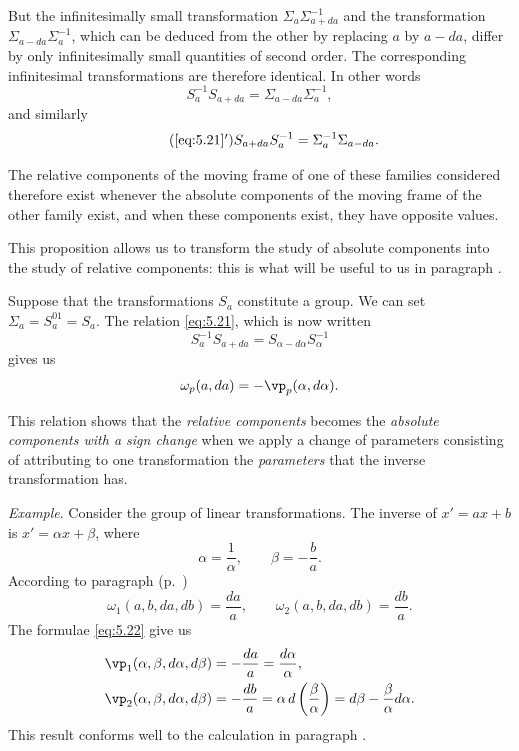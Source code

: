But the infinitesimally small transformation $\Sigma_{a}\Sigma_{a+da}^{-1}$ and the transformation $\Sigma_{a-da}\Sigma_{a}^{-1}$, which can be deduced from the other by replacing $a$ by $a-da$, differ by only infinitesimally small quantities of second order. The corresponding infinitesimal transformations are therefore identical. In other words
\begin{equation}
  \label{eq:5.21}
  S_{a}^{-1}S_{a+da}=\Sigma_{a-da}\Sigma_{a}^{-1},
\end{equation}
and similarly
\begin{equation}
  \label{eq:5.21'}\tag{\ref{eq:5.21}$'$}
  S_{a+da}S_{a}^{-1}=\Sigma^{-1}_{a}\Sigma_{a-da}.
\end{equation}

The relative components of the moving frame of one of these families considered therefore exist whenever the absolute components of the moving frame of the other family exist, and when these components exist, they have opposite values.

This proposition allows us to transform the study of absolute components into the study of relative components: this is what will be useful to us in paragraph .

Suppose that the transformations $S_{a}$ constitute a group. We can set $\Sigma_{a}=S_{a}^{01}=S_{a}$. The relation \eqref{eq:5.21}, which is now written
\[
S_{a}^{-1}S_{a+da}=S_{\alpha-d\alpha}S_{\alpha}^{-1}
\]
gives us
\begin{equation}
  \label{eq:5.22}
  \omega_{p}(a,da)=-\vp_{p}(\alpha,d\alpha).
\end{equation}

This relation shows that the \emph{relative components} becomes the \emph{absolute components with a sign change} when we apply a change of parameters consisting of attributing to one transformation the \emph{parameters} that the inverse transformation has.

\somespace

{\small
\emph{Example}. Consider the group of linear transformations. The inverse of $x'=ax+b$ is $x'=\alpha x+\beta$, where
\[
\alpha=\frac{1}{\alpha},\qquad \beta=-\frac{b}{a}.
\]
According to paragraph  (p.~\pageref{sec:71})
\[
\omega_{1}(a,b,da,db)=\frac{da}{a},\qquad \omega_{2}(a,b,da,db)=\frac{db}{a}.
\]
The formulae \eqref{eq:5.22} give us
\begin{align*}
  \vp_{1}(\alpha,\beta,d\alpha,d\beta)&=-\frac{da}{a}=\frac{d\alpha}{\alpha},\\
  \vp_{2}(\alpha,\beta,d\alpha,d\beta)&=-\frac{db}{a}=\alpha\,d\left(\frac{\beta}{\alpha}\right)=d\beta-\frac{\beta}{\alpha}d\alpha.
\end{align*}
This result conforms well to the calculation in paragraph .
}

